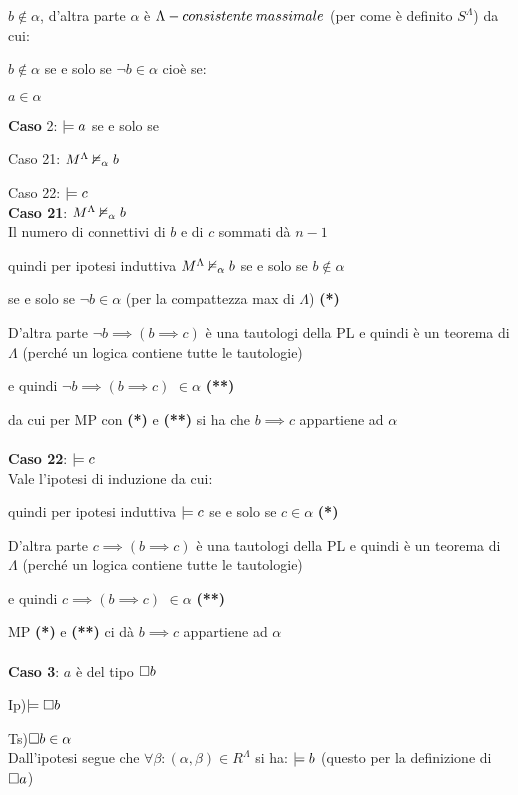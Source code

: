 $b\notin\alpha$, d'altra parte $\alpha$ è $\Lambda-consistente\: massimale$ (per come
è definito $S^{\Lambda}$) da cui:

\textbf{$b\notin\alpha$ }se e solo se \textbf{$ $}$\neg b\in\alpha$
cioè se:

$a\in\alpha$ 

\textbf{Caso} 2:$ $ $\models a$ se e solo se

Caso 21: $M^{\Lambda}\nvDash_{\alpha}b$ 

Caso 22: $\models c$\\


\textbf{Caso 21}: $M^{\Lambda}\nvDash_{\alpha}b$ \\


Il numero di connettivi di $b$ e di $c$ sommati dà $n-1$

quindi per ipotesi induttiva $M^{\Lambda}\nvDash_{\alpha}b$ se e solo se
$b\notin\alpha$ 

se e solo se $\neg b\in\alpha$ (per la compattezza max di $\Lambda$)
\textbf{({*})}

D'altra parte $\neg b\implies(b\implies c)$ è una tautologi della
PL e quindi è un teorema di $\Lambda$ (perché un logica contiene
tutte le tautologie)

e quindi $\neg b\implies(b\implies c)$ $\in\alpha$ \textbf{({*}{*})}

da cui per MP con \textbf{({*})} e \textbf{({*}{*})} si ha che $b\implies c$
appartiene ad $\alpha$\\
\\
\textbf{Caso 22}: $\models c$\\


Vale l'ipotesi di induzione da cui:

quindi per ipotesi induttiva $\models c$ se e solo se $c\in\alpha$
\textbf{({*})}

D'altra parte $c\implies(b\implies c)$ è una tautologi della PL e
quindi è un teorema di $\Lambda$ (perché un logica contiene tutte
le tautologie)

e quindi $c\implies(b\implies c)$ $\in\alpha$ \textbf{({*}{*})}

MP \textbf{({*}) }e \textbf{({*}{*}) }ci dà $b\implies c$ appartiene
ad $\alpha$\\
\\
\textbf{Caso 3}: $a$ è del tipo $\square b$

Ip)$\models\square b$

Ts)$\square b\in\alpha$\\


Dall'ipotesi segue che $\forall\beta:(\alpha,\beta)\in R^{\Lambda}$
si ha: $\models b$ (questo per la definizione di $\square a$)

